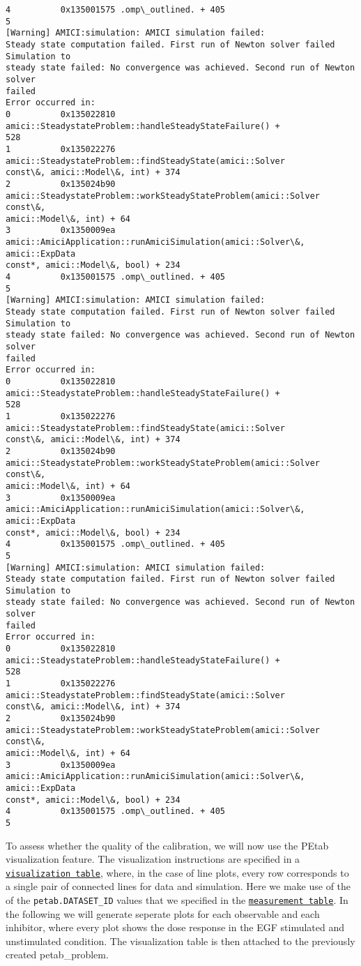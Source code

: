 \documentclass[11pt]{article}
\begin{document}
\begin{Verbatim}[commandchars=\\\{\}]
4          0x135001575 .omp\_outlined. + 405
5
[Warning] AMICI:simulation: AMICI simulation failed:
Steady state computation failed. First run of Newton solver failed Simulation to
steady state failed: No convergence was achieved. Second run of Newton solver
failed
Error occurred in:
0          0x135022810 amici::SteadystateProblem::handleSteadyStateFailure() +
528
1          0x135022276 amici::SteadystateProblem::findSteadyState(amici::Solver
const\&, amici::Model\&, int) + 374
2          0x135024b90
amici::SteadystateProblem::workSteadyStateProblem(amici::Solver const\&,
amici::Model\&, int) + 64
3          0x1350009ea
amici::AmiciApplication::runAmiciSimulation(amici::Solver\&, amici::ExpData
const*, amici::Model\&, bool) + 234
4          0x135001575 .omp\_outlined. + 405
5
[Warning] AMICI:simulation: AMICI simulation failed:
Steady state computation failed. First run of Newton solver failed Simulation to
steady state failed: No convergence was achieved. Second run of Newton solver
failed
Error occurred in:
0          0x135022810 amici::SteadystateProblem::handleSteadyStateFailure() +
528
1          0x135022276 amici::SteadystateProblem::findSteadyState(amici::Solver
const\&, amici::Model\&, int) + 374
2          0x135024b90
amici::SteadystateProblem::workSteadyStateProblem(amici::Solver const\&,
amici::Model\&, int) + 64
3          0x1350009ea
amici::AmiciApplication::runAmiciSimulation(amici::Solver\&, amici::ExpData
const*, amici::Model\&, bool) + 234
4          0x135001575 .omp\_outlined. + 405
5
[Warning] AMICI:simulation: AMICI simulation failed:
Steady state computation failed. First run of Newton solver failed Simulation to
steady state failed: No convergence was achieved. Second run of Newton solver
failed
Error occurred in:
0          0x135022810 amici::SteadystateProblem::handleSteadyStateFailure() +
528
1          0x135022276 amici::SteadystateProblem::findSteadyState(amici::Solver
const\&, amici::Model\&, int) + 374
2          0x135024b90
amici::SteadystateProblem::workSteadyStateProblem(amici::Solver const\&,
amici::Model\&, int) + 64
3          0x1350009ea
amici::AmiciApplication::runAmiciSimulation(amici::Solver\&, amici::ExpData
const*, amici::Model\&, bool) + 234
4          0x135001575 .omp\_outlined. + 405
5
    \end{Verbatim}

    To assess whether the quality of the calibration, we will now use the
PEtab visualization feature. The visualization instructions are
specified in a
\href{https://petab.readthedocs.io/en/latest/documentation_data_format.html\#visualization-table}{\texttt{visualization\ table}},
where, in the case of line plots, every row corresponds to a single pair
of connected lines for data and simulation. Here we make use of the of
the \texttt{petab.DATASET\_ID} values that we specified in the
\href{https://petab.readthedocs.io/en/latest/documentation_data_format.html\#measurement-table}{\texttt{measurement\ table}}.
In the following we will generate seperate plots for each observable and
each inhibitor, where every plot shows the dose response in the EGF
stimulated and unstimulated condition. The visualization table is then
attached to the previously created petab\_problem.
\end{document}
